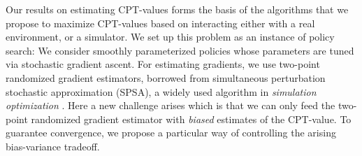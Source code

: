 Our results on estimating CPT-values forms the basis of the algorithms that we propose to maximize CPT-values based on interacting either with a real environment, or a simulator. We set up this problem as an instance of policy search: We consider smoothly parameterized policies whose parameters are tuned via stochastic gradient ascent. For estimating gradients, we use two-point randomized gradient estimators, borrowed from simultaneous perturbation stochastic approximation (SPSA), a widely used algorithm in \textit{simulation optimization} \cite{fu2015handbook}.
Here a new challenge arises which is that we can only feed the two-point randomized gradient estimator with \emph{biased} estimates of the CPT-value. To guarantee convergence, we propose a particular way of controlling the arising bias-variance tradeoff.
%
%

